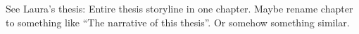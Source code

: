 See Laura's thesis: Entire thesis storyline in one chapter. Maybe rename chapter to something like ``The narrative of this thesis''. Or somehow something similar.
